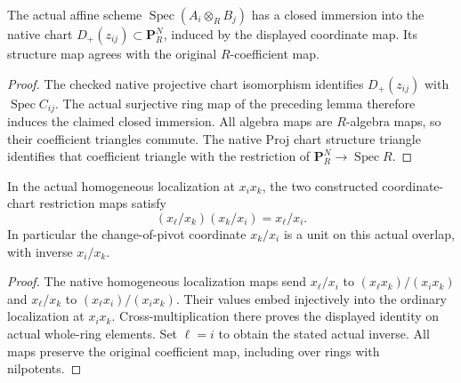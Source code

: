 \begin{lemma}
\label{lem:segre-native-chart-closed-immersion}
\leanok
The actual affine scheme
$\operatorname{Spec}(A_i\otimes_R B_j)$ has a closed
immersion into the native chart $D_+(z_{ij})\subset
\mathbf P_R^N$, induced by the displayed coordinate map.
Its structure map agrees with the original $R$-coefficient map.
\end{lemma}
\begin{proof}
The checked native projective chart isomorphism identifies
$D_+(z_{ij})$ with $\operatorname{Spec}C_{ij}$.
The actual surjective ring map of the preceding lemma
therefore induces the claimed closed immersion.
All algebra maps are $R$-algebra maps, so their coefficient
triangles commute. The native Proj chart structure
triangle identifies that coefficient triangle with the
restriction of $\mathbf P_R^N\to\operatorname{Spec}R$.
\end{proof}

\endgroup

\begingroup

\begin{lemma}
\label{lem:segre-native-coordinate-overlap}
\leanok
In the actual homogeneous localization at $x_i x_k$, the two
constructed coordinate-chart restriction maps satisfy
\[
 (x_\ell/x_k)(x_k/x_i)=x_\ell/x_i.
\]
In particular the change-of-pivot coordinate $x_k/x_i$ is a unit
on this actual overlap, with inverse $x_i/x_k$.
\end{lemma}
\begin{proof}
The native homogeneous localization maps send $x_\ell/x_i$ to
$(x_\ell x_k)/(x_i x_k)$ and $x_\ell/x_k$ to
$(x_\ell x_i)/(x_i x_k)$. Their values embed injectively into the
ordinary localization at $x_i x_k$. Cross-multiplication there proves
the displayed identity on actual whole-ring elements. Set $\ell=i$
to obtain the stated actual inverse. All maps preserve the original
coefficient map, including over rings with nilpotents.
\end{proof}

\endgroup
